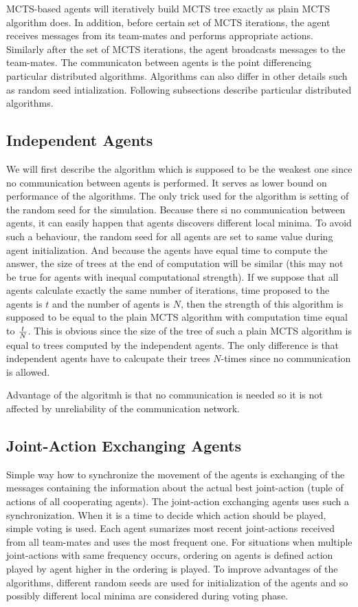 MCTS-based agents will iteratively build MCTS tree exactly as plain MCTS algorithm does. In
addition, before certain set of MCTS iterations, the agent receives messages from its team-mates
and performs appropriate actions. Similarly after the set of MCTS iterations, the agent
broadcasts messages to the team-mates. The communicaton between agents is the point differencing
particular distributed algorithms. Algorithms can also differ in other details such as random
seed intialization. Following subsections describe particular distributed algorithms.


\subsection{Independent Agents}

We will first describe the algorithm which is supposed to be the weakest one since no
communication between agents is performed. It serves as lower bound on performance of the
algorithms. The only trick used for the algorithm is setting of the random seed for the
simulation. Because there si no communication between agents, it can easily happen that agents
discovers different local minima. To avoid such a behaviour, the random seed for all agents are
set to same value during agent initialization. And because the agents have equal time to
compute the answer, the size of trees at the end of computation will be similar (this may not
be true for agents with inequal computational strength). If we suppose that all agents
calculate exactly the same number of iterations, time proposed to the agents is $t$ and the 
number of agents is $N$, then the
strength of this algorithm is supposed to be equal to the plain MCTS algorithm with computation
time equal to $t \over N$. This is obvious since the size of the tree of such a plain MCTS
algorithm is equal to trees computed by the independent agents. The only difference is that
independent agents have to calcupate their trees $N$-times since no communication is allowed.

Advantage of the algoritmh is that no communication is needed so it is not affected by
unreliability of the communication network.



\subsection{Joint-Action Exchanging Agents}

Simple way how to synchronize the movement of the agents is exchanging of the messages
containing the information about the actual best joint-action (tuple of actions of all
cooperating agents). The joint-action exchanging agents uses such a synchronization. When it is
a time to decide which action should be played, simple voting is used. Each agent sumarizes
most recent joint-actions received from all team-mates and uses the most frequent one. For
situations when multiple joint-actions with same frequency occurs, ordering on agents is
defined action played by agent higher in the ordering is played. To improve advantages of the
algorithms, different random seeds are used for initialization of the agents and so possibly
different local minima are considered during voting phase.

